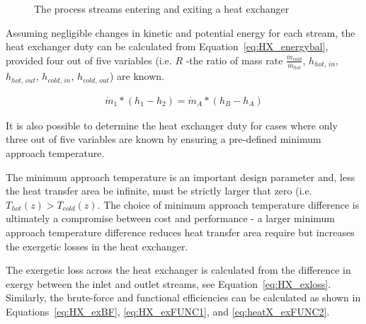         \begin{figure}[H]
            \centering
                        
            \caption{The process streams entering and exiting a heat exchanger}
            \label{fig:heat_exchanger}
        \end{figure}

        Assuming negligible changes in kinetic and potential energy for each stream, the heat exchanger duty can be calculated from Equation~\eqref{eq:HX_energybal}, provided four out of five variables (i.e. \(R\) -the ratio of mass rate \(\frac{\Dot{m}_{cold}}{\Dot{m}_{hot}}\), \(h_{hot,\, in}\), \(h_{hot,\, out}\), \(h_{cold,\, in}\), \(h_{cold,\, out}\)) are known.
    
        \begin{align} 
            \Dot{m}_{1} * (h_{1} - h_{2}) = \Dot{m}_{A} * (h_{B} - h_{A}) \label{eq:HX_energybal}
        \end{align}
    
        It is also possible to determine the heat exchanger duty for cases where only three out of five variables are known by ensuring a pre-defined minimum approach temperature. 
        
        The minimum approach temperature is an important design parameter and, less the heat transfer area be infinite, must be strictly larger that zero (i.e. \(T_{hot}(z)>T_{cold}(z)\). The choice of minimum approach temperature difference is ultimately a compromise between cost and performance - a larger minimum approach temperature difference reduces heat transfer area require but increases the exergetic losses in the heat exchanger.
    


        The exergetic loss across the heat exchanger is calculated from the difference in exergy between the inlet and outlet streams, see Equation~\ref{eq:HX_exloss}. Similarly, the brute-force and functional efficiencies can be calculated as shown in Equations~\ref{eq:HX_exBF}, \ref{eq:HX_exFUNC1}, and \ref{eq:heatX_exFUNC2}.

